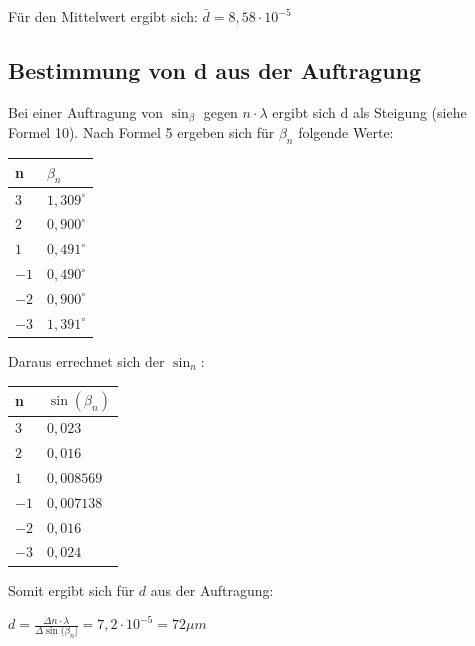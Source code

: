 \documentclass[12pt,a4paper,titlepage,headinclude,bibtotoc]{scrartcl}
\begin{document}
Für den Mittelwert ergibt sich:
$\bar{d} = 8,58\cdot 10^{-5}$

\subsection{Bestimmung von d aus der Auftragung}

Bei einer Auftragung von $\sin_\beta $ gegen $n \cdot \lambda $ ergibt sich d als Steigung (siehe Formel 10). 
Nach Formel 5 ergeben sich für $\beta_n$ folgende Werte:

\begin{table} [h]
\centering
\begin{tabular}{|p{4 cm}||p{4 cm}|}
        \hline
		n & $\beta_n$ \\
         \hline 
         $3$ & $1,309^\circ$  \\
         \hline
         $2$ & $0,900^\circ$ \\
         \hline
         $1$ & $0,491^\circ$\\
         \hline
         $-1$ & $0,490^\circ$   \\
         \hline
         $-2$ & $0,900^\circ$  \\
         \hline             
         $-3$ & $1,391^\circ$   \\
         \hline
\end{tabular}
\end{table}

Daraus errechnet sich der $\sin_n$:

\begin{table} [h]
\centering
\begin{tabular}{|p{4 cm}||p{4 cm}|}
        \hline
		n & $\sin(\beta_n)$ \\
         \hline 
         $3$ & $0,023$  \\
         \hline
         $2$ & $0,016$ \\
         \hline
         $1$ & $0,008569$\\
         \hline
         $-1$ & $0,007138$   \\
         \hline
         $-2$ & $0,016$  \\
         \hline             
         $-3$ & $0,024$   \\
         \hline
\end{tabular}
\end{table}

Somit ergibt sich für $d$ aus der Auftragung:

$ d= \frac{\Delta n \cdot \lambda}{\Delta \sin(\beta_n]} = 7,2\cdot 10^{-5} = 72\mu m $
\end{document}
